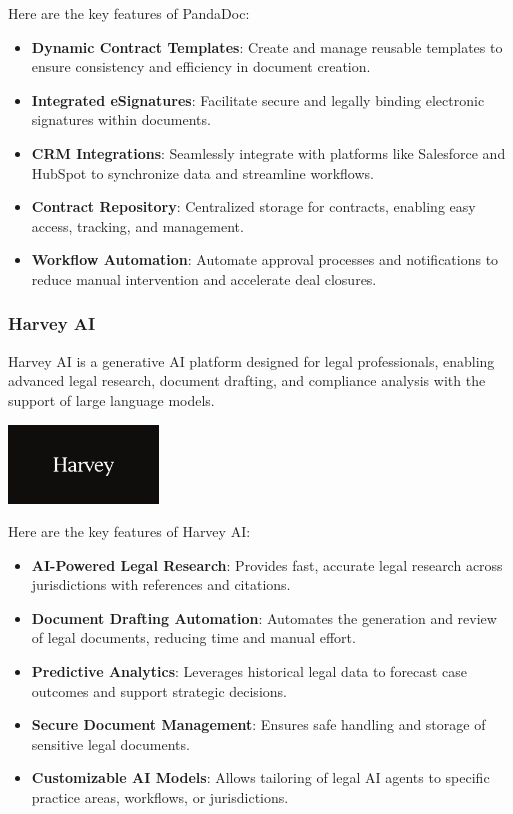 Here are the key features of PandaDoc:
\begin{itemize}
    \item \textbf{Dynamic Contract Templates}: Create and manage reusable templates to ensure consistency and efficiency in document creation.
    \item \textbf{Integrated eSignatures}: Facilitate secure and legally binding electronic signatures within documents. 
    \item \textbf{CRM Integrations}: Seamlessly integrate with platforms like Salesforce and HubSpot to synchronize data and streamline workflows. 
    \item \textbf{Contract Repository}: Centralized storage for contracts, enabling easy access, tracking, and management. 
    \item \textbf{Workflow Automation}: Automate approval processes and notifications to reduce manual intervention and accelerate deal closures. 
\end{itemize}

\subsubsection{Harvey AI}
Harvey AI is a generative AI platform designed for legal professionals, enabling advanced legal research, document drafting, and compliance analysis with the support of large language models.\mynewline

\begin{center}
    \centering
    \includegraphics[width=0.3\textwidth]{Images/harveyai_logo.png}
     \cite{harveyai}
    \label{fig:harveyai}
\end{center}

Here are the key features of Harvey AI:
\begin{itemize}
    \item \textbf{AI-Powered Legal Research}: Provides fast, accurate legal research across jurisdictions with references and citations.
    \item \textbf{Document Drafting Automation}: Automates the generation and review of legal documents, reducing time and manual effort.
    \item \textbf{Predictive Analytics}: Leverages historical legal data to forecast case outcomes and support strategic decisions.
    \item \textbf{Secure Document Management}: Ensures safe handling and storage of sensitive legal documents.
    \item \textbf{Customizable AI Models}: Allows tailoring of legal AI agents to specific practice areas, workflows, or jurisdictions.
\end{itemize}

